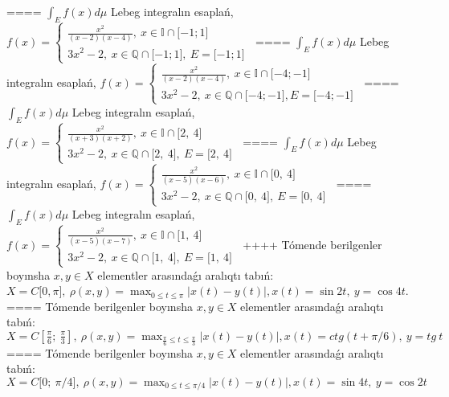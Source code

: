 ====
\(\int_{E}^{}f(x)d\mu\) Lebeg integralın esaplań, \(f(x) = \left\{ \begin{matrix}
\frac{x^{2}}{(x - 2)(x - 4)},\ x \in \mathbb{I} \cap \lbrack - 1;1\rbrack \\
3x^{2} - 2,\ x\mathbb{\in Q \cap}\lbrack - 1;1\rbrack,\ E = \lbrack - 1;1\rbrack
\end{matrix} \right.\ \)
====
\(\int_{E}^{}f(x)d\mu\) Lebeg integralın esaplań, \(f(x) = \left\{ \begin{matrix}
\frac{x^{2}}{(x - 2)(x - 4)},\ x \in \mathbb{I} \cap \lbrack - 4; - 1\rbrack \\
3x^{2} - 2,\ x\mathbb{\in Q \cap}\lbrack - 4; - 1\rbrack,E = \lbrack - 4; - 1\rbrack
\end{matrix} \right.\ \)
====
\(\int_{E}^{}f(x)d\mu\) Lebeg integralın esaplań, \(f(x) = \left\{ \begin{matrix}
\frac{x^{2}}{(x + 3)(x + 2)},\ x \in \mathbb{I} \cap \lbrack 2,\ 4\rbrack \\
3x^{2} - 2,\ x\mathbb{\in Q \cap}\lbrack 2,\ 4\rbrack,\ E = \lbrack 2,\ 4\rbrack
\end{matrix} \right.\ \)
====
\(\int_{E}^{}f(x)d\mu\) Lebeg integralın esaplań, \(f(x) = \left\{ \begin{matrix}
\frac{x^{2}}{(x - 5)(x - 6)},\ x \in \mathbb{I} \cap \lbrack 0,\ 4\rbrack \\
3x^{2} - 2,\ x\mathbb{\in Q \cap}\lbrack 0,\ 4\rbrack,\ E = \lbrack 0,\ 4\rbrack
\end{matrix} \right.\ \)
====
\(\int_{E}^{}f(x)d\mu\) Lebeg integralın esaplań, \(f(x) = \left\{ \begin{matrix}
\frac{x^{2}}{(x - 5)(x - 7)},\ x \in \mathbb{I} \cap \lbrack 1,\ 4\rbrack \\
3x^{2} - 2,\ x\mathbb{\in Q \cap}\lbrack 1,\ 4\rbrack,\ E = \lbrack 1,\ 4\rbrack
\end{matrix} \right.\ \)
++++
Tómende berilgenler boyınsha \(x,y \in X\) elementler arasındaǵı aralıqtı tabıń: \(X = C\lbrack 0,\pi\rbrack,\ \rho(x,y) = \max _{0 \leq t \leq \pi}|x(t) - y(t)|,x(t) = \sin2t,\ y = \cos4t\).
====
Tómende berilgenler boyınsha \(x,y \in X\) elementler arasındaǵı aralıqtı tabıń: \(X = C\left\lbrack \frac{\pi}{6};\ \frac{\pi}{3} \right\rbrack,\ \rho(x,y) = \max _{\frac{\pi}{6} \leq t \leq \frac{\pi}{3}}|x(t) - y(t)|,x(t) = ctg(t + \pi/6),\ y = tg\ t\)
====
Tómende berilgenler boyınsha \(x,y \in X\) elementler arasındaǵı aralıqtı tabıń: \(X = C\lbrack 0;\ \pi/4\rbrack,\ \rho(x,y) = \max _{0 \leq t \leq \pi/4}|x(t) - y(t)|,x(t) = \sin4t,\ y = \cos2t\)
